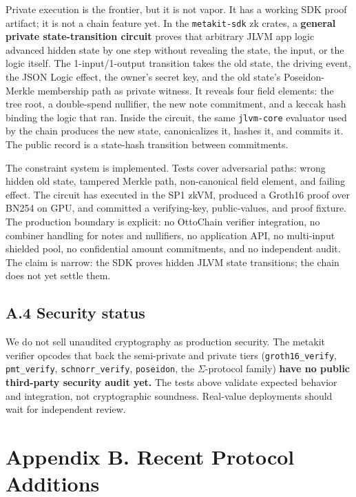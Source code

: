 \documentclass[11pt,a4paper]{article}
\begin{document}
Private execution is the frontier, but it is not vapor. It has a working SDK proof artifact; it is not a chain feature yet. In the \texttt{metakit-sdk} zk crates, a \textbf{general private state-transition circuit} proves that arbitrary JLVM app logic advanced hidden state by one step without revealing the state, the input, or the logic itself. The 1-input/1-output transition takes the old state, the driving event, the JSON Logic effect, the owner's secret key, and the old state's Poseidon-Merkle membership path as private witness. It reveals four field elements: the tree root, a double-spend nullifier, the new note commitment, and a keccak hash binding the logic that ran. Inside the circuit, the same \texttt{jlvm-core} evaluator used by the chain produces the new state, canonicalizes it, hashes it, and commits it. The public record is a state-hash transition between commitments.

The constraint system is implemented. Tests cover adversarial paths: wrong hidden old state, tampered Merkle path, non-canonical field element, and failing effect. The circuit has executed in the SP1 zkVM, produced a Groth16 proof over BN254 on GPU, and committed a verifying-key, public-values, and proof fixture. The production boundary is explicit: no OttoChain verifier integration, no combiner handling for notes and nullifiers, no application API, no multi-input shielded pool, no confidential amount commitments, and no independent audit. The claim is narrow: the SDK proves hidden JLVM state transitions; the chain does not yet settle them.

\subsection{A.4 Security status}

We do not sell unaudited cryptography as production security. The metakit verifier opcodes that back the semi-private and private tiers (\texttt{groth16\_verify}, \texttt{pmt\_verify}, \texttt{schnorr\_verify}, \texttt{poseidon}, the $\Sigma$-protocol family) \textbf{have no public third-party security audit yet.} The tests above validate expected behavior and integration, not cryptographic soundness. Real-value deployments should wait for independent review.

\section{Appendix B. Recent Protocol Additions}
\end{document}
